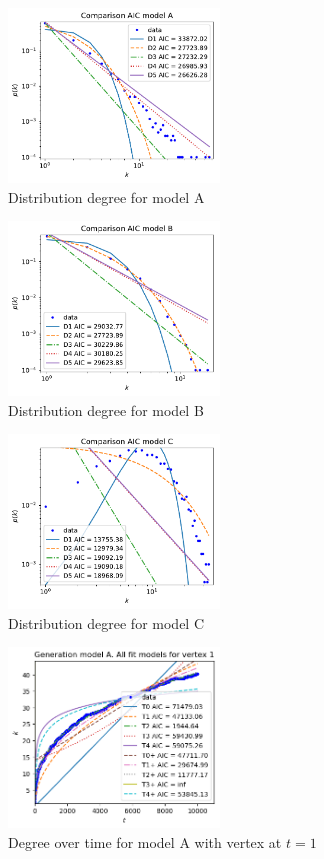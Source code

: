 \documentclass[a4paper]{article}
\begin{document}
\begin{figure}[H]
		\centering
		\includegraphics[width=0.5\textwidth]{modelA/all_dd.pdf}
		\caption{Distribution degree for model A}
		\label{fig:all_dd_A}
\end{figure}
%
\begin{figure}[H]
		\centering
		\includegraphics[width=0.5\textwidth]{modelB/all_dd.pdf}
		\caption{Distribution degree for model B}
		\label{fig:all_dd_B}
\end{figure}
%
\begin{figure}[H]
		\centering
		\includegraphics[width=0.5\textwidth]{modelC/all_dd.pdf}
		\caption{Distribution degree for model C}
		\label{fig:all_dd_C}
\end{figure}
%
\begin{figure}[H]
    \centering
		\includegraphics[width=0.5\textwidth]{modelA/all_dt1.png}
		\caption{Degree over time for model A with vertex at $t=1$}
\end{figure}
\end{document}
